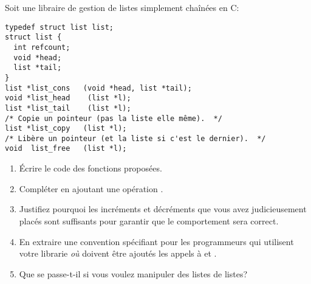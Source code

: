 \begin{Exercise}[title={Compteur de références}]
Soit une libraire de gestion de listes simplement chaînées en C:
\begin{verbatim}
typedef struct list list;
struct list {
  int refcount;
  void *head;
  list *tail;
}
list *list_cons   (void *head, list *tail);
void *list_head    (list *l);
list *list_tail    (list *l);
/* Copie un pointeur (pas la liste elle même).  */
list *list_copy   (list *l);
/* Libère un pointeur (et la liste si c'est le dernier).  */
void  list_free   (list *l);
\end{verbatim}

\begin{enumerate}
\item Écrire le code des fonctions proposées.
\item Compléter en ajoutant une opération .
\item Justifiez pourquoi les incréments et décréments que vous avez
judicieusement placés sont suffisants pour garantir que le comportement
sera correct.
\item En extraire une convention spécifiant pour les programmeurs qui
utilisent votre librarie \emph{où} doivent être ajoutés les appels à
 et .
\item Que se passe-t-il si vous voulez manipuler des listes de listes?
\end{enumerate}
\end{Exercise}